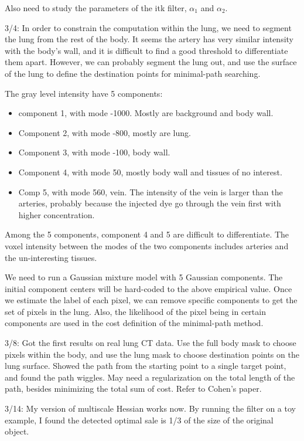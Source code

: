 \documentclass[12pt]{article}
\begin{document}
Also need to study the parameters of the itk filter, $\alpha_1$ and
$\alpha_2$.

3/4: In order to constrain the computation within the lung, we need to segment
the lung from the rest of the body. It seems the artery has very similar
intensity with the body's wall, and it is difficult to find a good threshold
to differentiate them apart. However, we can probably segment the lung
out, and use the surface of the lung to define the destination  points for
minimal-path searching. 

The gray level intensity have 5 components:
\begin{itemize}
\item component 1, with mode -1000. Mostly are background and body wall.
\item Component 2, with mode -800, mostly are lung.
\item Component 3, with mode -100, body wall.
\item Component 4, with mode 50, mostly body wall and tissues of no interest. 
\item Comp 5, with mode 560, vein. The intensity of the vein is larger than
  the arteries, probably because the injected  dye go through the vein first
  with higher concentration. 
\end{itemize}

Among the 5 components, component 4 and 5 are difficult to differentiate. The
voxel intensity between the modes of the two components includes arteries and
the un-interesting tissues. 

We need to run a Gaussian mixture model with 5 Gaussian components. The
initial component centers will be hard-coded to the above empirical
value. Once we estimate the label of each pixel, we can remove specific
components to get the set of pixels in the lung. Also, the likelihood of the
pixel being in certain components are used in the cost definition of the
minimal-path method. 

3/8: Got the first results on real lung CT data. Use the full body mask to
choose pixels within the body, and use the lung mask to choose destination
points on the lung surface. Showed the path from the starting point to a
single target point, and found the path wiggles. May need a regularization
on the total length of the path, besides minimizing the total sum of
cost. Refer to Cohen's paper. 

3/14: My version of multiscale Hessian works now. By running the filter on a
toy example, I found the detected optimal sale is 1/3 of the size of the
original object.
\end{document}
